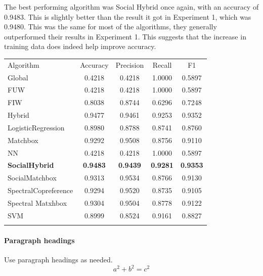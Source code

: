 The best performing algorithm was Social Hybrid once again, with an accuracy of 0.9483. This is slightly better than the result it got in Experiment 1, which was 0.9480. This was the same for most of the algorithms, they generally outperformed their results in Experiment 1. This suggests that the increase in training data does indeed help improve accuracy.

\begin{table}
\begin{tabular}{ l  c  c  c  c }
\hline\noalign{\smallskip}
Algorithm & Accuracy & Precision & Recall & F1 \\
 \noalign{\smallskip}\hline\noalign{\smallskip}
Global & 0.4218 & 0.4218 & 1.0000 & 0.5897 \\
FUW & 0.4218 & 0.4218 & 1.0000 & 0.5897 \\
FIW & 0.8038 & 0.8744 & 0.6296 & 0.7248 \\
Hybrid & 0.9477 & 0.9461 & 0.9253 & 0.9352 \\
LogisticRegression & 0.8980 & 0.8788 & 0.8741 & 0.8760 \\
Matchbox & 0.9292 & 0.9508 & 0.8756 & 0.9110 \\
NN & 0.4218 & 0.4218 & 1.0000 & 0.5897 \\
{\bf SocialHybrid} & {\bf 0.9483} & {\bf 0.9439} & {\bf 0.9281} & {\bf 0.9353} \\
SocialMatchbox & 0.9313 & 0.9534 & 0.8766 & 0.9130 \\
SpectralCopreference & 0.9294 & 0.9520 & 0.8735 & 0.9105 \\
Spectral Matxhbox & 0.9304 & 0.9504 & 0.8778 & 0.9122 \\
SVM & 0.8999 & 0.8524 & 0.9161 & 0.8827 \\
\noalign{\smallskip}\hline
\end{tabular} 
\end{table}

\paragraph{Paragraph headings} Use paragraph headings as needed.
\begin{equation}
a^2+b^2=c^2
\end{equation}


